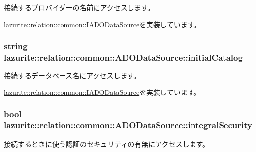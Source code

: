接続するプロバイダーの名前にアクセスします。 

\hyperlink{interfacelazurite_1_1relation_1_1common_1_1_i_a_d_o_data_source_abb1ba827134336f1622cd05376bfa797}{lazurite::relation::common::IADODataSource}を実装しています。\hypertarget{classlazurite_1_1relation_1_1common_1_1_a_d_o_data_source_a1f193a5ed7eb84c41dc0d746ec8abade}{
\subsubsection[{initialCatalog}]{\setlength{\rightskip}{0pt plus 5cm}string lazurite::relation::common::ADODataSource::initialCatalog}}
\label{classlazurite_1_1relation_1_1common_1_1_a_d_o_data_source_a1f193a5ed7eb84c41dc0d746ec8abade}


接続するデータベース名にアクセスします。 

\hyperlink{interfacelazurite_1_1relation_1_1common_1_1_i_a_d_o_data_source_a27a84f2fbf21b934ded2597f5c99e30c}{lazurite::relation::common::IADODataSource}を実装しています。\hypertarget{classlazurite_1_1relation_1_1common_1_1_a_d_o_data_source_a119ec013a937e5e9caa70c3647e78dae}{
\subsubsection[{integralSecurity}]{\setlength{\rightskip}{0pt plus 5cm}bool lazurite::relation::common::ADODataSource::integralSecurity}}
\label{classlazurite_1_1relation_1_1common_1_1_a_d_o_data_source_a119ec013a937e5e9caa70c3647e78dae}


接続するときに使う認証のセキュリティの有無にアクセスします。 

